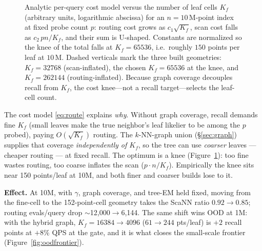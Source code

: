 \documentclass{article}
\newcommand{\effect}[1]{\par\smallskip\noindent\textbf{Effect.} #1}
\begin{document}
\begin{figure}[t]
  \caption{Analytic per-query cost model versus the number of leaf cells $K_f$
  (arbitrary units, logarithmic abscissa) for an $n=10$\,M-point index at fixed
  probe count $p$: routing cost grows as $c_1\sqrt{K_f}$, scan cost falls as
  $c_2\,pn/K_f$, and their sum is U-shaped. Constants are normalized so the knee
  of the total falls at $K_f=65536$, i.e.\ roughly $150$ points per leaf at
  $10$\,M. Dashed verticals mark the three built geometries: $K_f{=}32768$
  (scan-inflated), the chosen $K_f{=}65536$ at the knee, and $K_f{=}262144$
  (routing-inflated). Because graph coverage decouples recall from $K_f$, the
  cost knee---not a recall target---selects the leaf-cell count.}
  \label{fig:knee}
\end{figure}

The cost model \eqref{eq:route} explains \emph{why}. Without graph coverage, recall
demands fine $K_f$ (small leaves make the true neighbor's leaf likelier to be among
the $p$ probed), paying $O(\sqrt{K_f})$ routing. The $k$-NN-graph union
(\S\ref{sec:graph}) supplies that coverage \emph{independently of $K_f$}, so the tree
can use \emph{coarser} leaves --- cheaper routing --- at fixed recall. The optimum is a
knee (Figure~\ref{fig:knee}): too fine wastes routing, too coarse inflates the scan ($p\cdot n/K_f$).
Empirically the knee sits near 150 points/leaf at 10M, and both finer and coarser
builds lose to it.
\effect{At 10M, with $\gamma$, graph coverage, and tree-EM held fixed, moving from the
fine-cell to the 152-point-cell geometry takes the ScaNN ratio $0.92\to0.85$; routing evals/query drop $\sim$12{,}000$\to$6{,}144.
The same shift wins OOD at 1M: with the hybrid graph, $K_f{=}16384\to4096$
($61\to244$ pts/leaf) is $+2$ recall points at $+8\%$ QPS at the gate, and it is
what closes the small-scale frontier (Figure~\ref{fig:oodfrontier}).}
\end{document}
